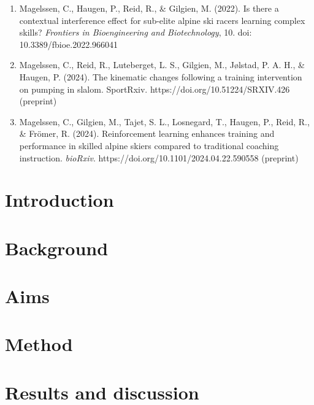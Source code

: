 \documentclass[12pt, twoside]{report}
\begin{document}
\begin{enumerate}[label=\Roman*.]
\item Magelssen, C., Haugen, P., Reid, R., \& Gilgien, M. (2022). Is there a
contextual interference effect for sub-elite alpine ski racers learning complex skills? \textit{Frontiers in Bioengineering and Biotechnology}, 10. doi: 10.3389/fbioe.2022.966041
    \item Magelssen, C., Reid, R., Luteberget, L. S., Gilgien, M., Jølstad, P. A. H., \& Haugen, P. (2024). The kinematic changes following a training intervention on pumping in slalom. SportRxiv. https://doi.org/10.51224/SRXIV.426 (preprint)
    \item Magelssen, C., Gilgien, M., Tajet, S. L., Losnegard, T., Haugen, P., Reid,
R., \& Frömer, R. (2024). Reinforcement learning enhances training and performance in skilled alpine skiers compared to traditional coaching instruction. \textit{bioRxiv}. https://doi.org/10.1101/2024.04.22.590558 (preprint)
\end{enumerate}



\tableofcontents
\listoffigures


%


\chapter{Introduction}


\chapter{Background}


\chapter{Aims}



\chapter{Method}



\chapter{Results and discussion}

\end{document}
